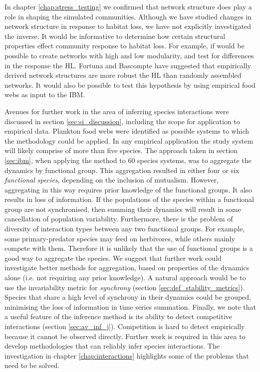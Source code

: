 In chapter \ref{chap:stress_testing} we confirmed that network structure does play a role in shaping the simulated communities. Although we have studied changes in network structure in response to habitat loss, we have not explicitly investigated the inverse. It would be informative to determine how certain structural properties effect community response to habitat loss. For example, if would be possible to create networks with high and low modularity, and test for differences in the response the HL. Fortuna and Bascompte \cite{fortuna2006habitat} have suggested that empirically derived network structures are more robust the HL than randomly assembled networks. It would also be possible to test this hypothesis by using empirical food webs as input to the IBM. 

Avenues for further work in the area of inferring species interactions were discussed in section \ref{sec:si_discussion}, including the scope for application to empirical data. Plankton food webs were identified as possible systems to which the methodology could be applied. In any empirical application the study system will likely comprise of more than five species. The approach taken in section \ref{sec:ibm}, when applying the method to 60 species systems, was to aggregate the dynamics by functional group. This aggregation resulted in either four or six \emph{functional species}, depending on the inclusion of mutualism. However, aggregating in this way requires prior knowledge of the functional groups. It also results in loss of information. If the populations of the species within a functional group are not synchronised, then summing their dynamics will result in some cancellation of population variability. Furthermore, there is the problem of diversity of interaction types between any two functional groups. For example, some primary-predator species may feed on herbivores, while others mainly compete with them. Therefore it is unlikely that the use of functional groups is a good way to aggregate the species. We suggest that further work could investigate better methods for aggregation, based on properties of the dynamics alone (i.e. not requiring any prior knowledge). A natural approach would be to use the invariability metric for \emph{synchrony} (section \ref{sec:def_stability_metrics}). Species that share a high level of synchrony in their dynamics could be grouped, minimising the loss of information in time series summation. Finally, we note that a useful feature of the inference method is its ability to detect competitive interactions (section \ref{sec:av_inf_j}). Competition is hard to detect empirically because it cannot be observed directly. Further work is required in this area to develop methodologies that can reliably infer species interactions. The investigation in chapter \ref{chap:interactions} highlights some of the problems that need to be solved. 

